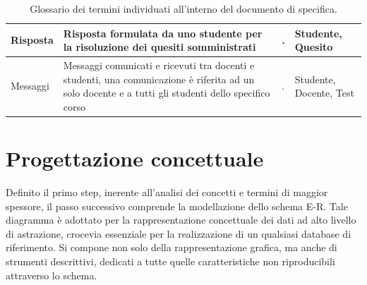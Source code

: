 \documentclass{article}
\begin{document}
\begin{table}[H]
\begin{tabularx}{\textwidth}{|X|p{6cm}|X|X|}
        \hline
        Risposta & Risposta formulata da uno studente per la risoluzione dei quesiti somministrati & . & Studente, Quesito \\
        \hline 
        Messaggi & Messaggi comunicati e ricevuti tra docenti e studenti, una comunicazione è riferita ad un solo docente e a tutti gli studenti dello specifico corso & . & Studente, Docente, Test \\
        \hline
    \end{tabularx}
    \caption{Glossario dei termini individuati all'interno del documento di specifica.}
\end{table}

\newpage
\section{Progettazione concettuale}
\large
Definito il primo step, inerente all'analisi dei concetti e termini di maggior spessore, il passo successivo comprende la modellazione dello schema E-R. Tale diagramma è adottato per la rappresentazione concettuale dei dati ad alto livello di astrazione, crocevia essenziale per la realizzazione di un qualsiasi database di riferimento. Si compone non solo della rappresentazione grafica, ma anche di strumenti descrittivi, dedicati a tutte quelle caratteristiche non riproducibili attraverso lo schema. 
\end{document}
